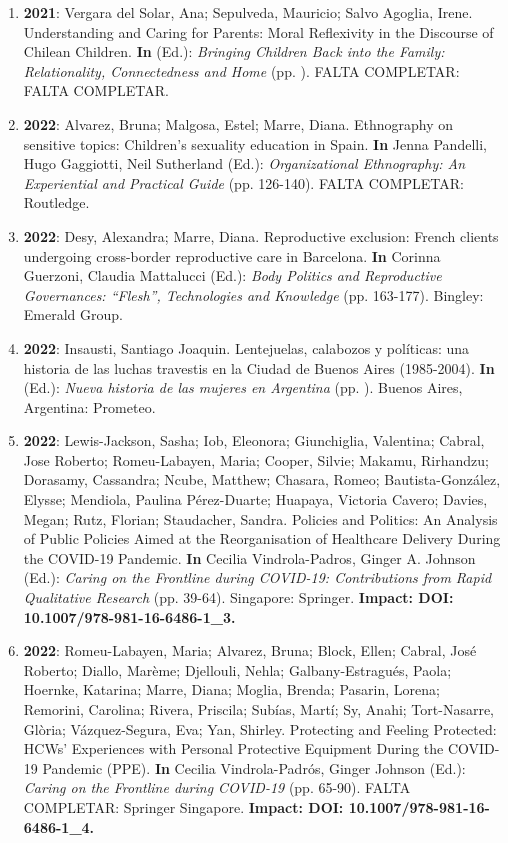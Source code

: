 \begin{enumerate}
\item {\bf 2021}: Vergara del Solar, Ana; Sepulveda, Mauricio; Salvo Agoglia, Irene. Understanding and Caring for Parents: Moral Reflexivity in the Discourse of Chilean Children. {\bf In}  (Ed.): {\it Bringing Children Back into the Family: Relationality, Connectedness and Home} (pp. ). FALTA COMPLETAR: FALTA COMPLETAR. {\bf }\filbreak
\item {\bf 2022}: Alvarez, Bruna; Malgosa, Estel; Marre, Diana. Ethnography on sensitive topics: Children's sexuality education in Spain. {\bf In} Jenna Pandelli, Hugo Gaggiotti, Neil Sutherland (Ed.): {\it Organizational Ethnography: An Experiential and Practical Guide} (pp. 126-140). FALTA COMPLETAR: Routledge. {\bf }\filbreak
\item {\bf 2022}: Desy, Alexandra; Marre, Diana. Reproductive exclusion: French clients undergoing cross-border reproductive care in Barcelona. {\bf In} Corinna Guerzoni, Claudia Mattalucci (Ed.): {\it Body Politics and Reproductive Governances: “Flesh”, Technologies and Knowledge} (pp. 163-177). Bingley: Emerald Group. {\bf }\filbreak
\item {\bf 2022}: Insausti, Santiago Joaquin. Lentejuelas, calabozos y políticas: una historia de las luchas travestis en la Ciudad de Buenos Aires (1985-2004). {\bf In}  (Ed.): {\it Nueva historia de las mujeres en Argentina} (pp. ). Buenos Aires, Argentina: Prometeo. {\bf }\filbreak
\item {\bf 2022}: Lewis-Jackson, Sasha; Iob, Eleonora; Giunchiglia, Valentina; Cabral, Jose Roberto; Romeu-Labayen, Maria; Cooper, Silvie; Makamu, Rirhandzu; Dorasamy, Cassandra; Ncube, Matthew; Chasara, Romeo; Bautista-González, Elysse; Mendiola, Paulina Pérez-Duarte; Huapaya, Victoria Cavero; Davies, Megan; Rutz, Florian; Staudacher, Sandra. Policies and Politics: An Analysis of Public Policies Aimed at the Reorganisation of Healthcare Delivery During the COVID-19 Pandemic. {\bf In} Cecilia Vindrola-Padros, Ginger A. Johnson (Ed.): {\it Caring on the Frontline during COVID-19: Contributions from Rapid Qualitative Research} (pp. 39-64). Singapore: Springer. {\bf Impact: DOI: 10.1007/978-981-16-6486-1\_3.}\filbreak
\item {\bf 2022}: Romeu-Labayen, Maria; Alvarez, Bruna; Block, Ellen; Cabral, José Roberto; Diallo, Marème; Djellouli, Nehla; Galbany-Estragués, Paola; Hoernke, Katarina; Marre, Diana; Moglia, Brenda; Pasarin, Lorena; Remorini, Carolina; Rivera, Priscila; Subías, Martí; Sy, Anahi; Tort-Nasarre, Glòria; Vázquez-Segura, Eva; Yan, Shirley. Protecting and Feeling Protected: HCWs' Experiences with Personal Protective Equipment During the COVID-19 Pandemic (PPE). {\bf In} Cecilia Vindrola-Padrós, Ginger Johnson (Ed.): {\it Caring on the Frontline during COVID-19} (pp. 65-90). FALTA COMPLETAR: Springer Singapore. {\bf Impact: DOI: 10.1007/978-981-16-6486-1\_4.}\filbreak

\end{enumerate}
